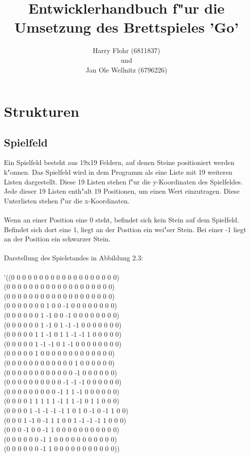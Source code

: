 \documentclass[a4paper]{scrreprt}
\begin{document}
 
\title{Entwicklerhandbuch f"ur die Umsetzung des Brettspieles 'Go'}
\author{Harry Flohr (6811837)\\und\\Jan Ole Wellnitz (6796226)}
\maketitle
 \tableofcontents 
 
 \chapter{Strukturen}
\section{Spielfeld}
\label{sec:Spielfeld}
Ein Spielfeld besteht aus 19x19 Feldern, auf denen Steine positioniert werden k"onnen. Das Spielfeld wird in dem Programm als eine Liste mit 19 weiteren Listen dargestellt. Diese 19 Listen stehen f"ur die y-Koordinaten des Spielfeldes. Jede dieser 19 Listen enth"alt 19 Positionen, um einen Wert einzutragen. Diese Unterlisten stehen f"ur die x-Koordinaten.\\\\
Wenn an einer Position eine 0 steht, befindet sich kein Stein auf dem Spielfeld. Befindet sich dort eine 1, liegt an der Position ein wei"ser Stein. Bei einer -1 liegt an der Position ein schwarzer Stein.\\
\\Darstellung des Spielstandes in Abbildung 2.3:\\\\
'((0 0 0 0 0 0 0 0 0 0 0 0 0 0 0 0 0 0 0)\\
  (0 0 0 0 0 0 0 0 0 0 0 0 0 0 0 0 0 0 0)\\
  (0 0 0 0 0 0 0 0 0 0 0 0 0 0 0 0 0 0 0)\\
  (0 0 0 0 0 0 0 1 0 0 -1 0 0 0 0 0 0 0 0)\\
  (0 0 0 0 0 0 1 -1 0 0 -1 0 0 0 0 0 0 0 0)\\
  (0 0 0 0 0 0 1 -1 0 1 -1 -1 0 0 0 0 0 0 0)\\
  (0 0 0 0 0 1 1 -1 0 1 1 -1 -1 1 0 0 0 0 0)\\
  (0 0 0 0 0 1 -1 -1 0 1 -1 0 0 0 0 0 0 0 0)\\
  (0 0 0 0 0 1 0 0 0 0 0 0 0 0 0 0 0 0 0)\\
  (0 0 0 0 0 0 0 0 0 0 0 0 1 0 0 0 0 0 0)\\
  (0 0 0 0 0 0 0 0 0 0 0 0 -1 0 0 0 0 0 0)\\
  (0 0 0 0 0 0 0 0 0 0 -1 -1 -1 0 0 0 0 0 0)\\
  (0 0 0 0 0 0 0 0 0 -1 1 1 -1 0 0 0 0 0 0)\\
  (0 0 0 0 1 1 1 1 1 -1 1 1 -1 0 1 1 0 0 0)\\
  (0 0 0 0 1 -1 -1 -1 -1 1 0 1 0 -1 0 -1 1 0 0)\\
  (0 0 0 1 -1 0 -1 1 1 0 0 1 -1 -1 -1 1 0 0 0)\\
  (0 0 0 -1 0 0 -1 1 0 0 0 0 0 0 0 0 0 0 0)\\
  (0 0 0 0 0 0 -1 1 0 0 0 0 0 0 0 0 0 0 0)\\
  (0 0 0 0 0 0 -1 1 0 0 0 0 0 0 0 0 0 0 0))\\
\end{document}
